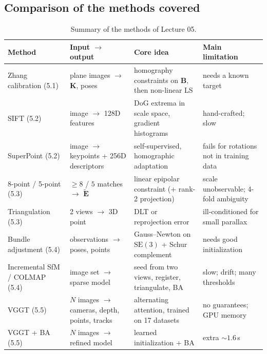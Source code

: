 \documentclass[11pt,a4paper]{article}
\newcommand{\SE}{\mathrm{SE}(3)}
\newcommand{\E}{\tilde{\bm E}}
\begin{document}
\subsection*{Comparison of the methods covered}
\begin{table}[H]
\centering
\small
\begin{tabular}{@{}p{2.9cm}p{3.5cm}p{4.0cm}p{3.1cm}@{}}
\toprule
Method & Input $\to$ output & Core idea & Main limitation\\
\midrule
Zhang calibration (5.1) & plane images $\to$ $\bm K$, poses & homography constraints on $\bm B$, then non-linear LS & needs a known target\\
SIFT (5.2) & image $\to$ 128D features & DoG extrema in scale space, gradient histograms & hand-crafted; slow\\
SuperPoint (5.2) & image $\to$ keypoints + 256D descriptors & self-supervised, homographic adaptation & fails for rotations not in training data\\
8-point / 5-point (5.3) & $\ge8$ / $5$ matches $\to$ $\E$ & linear epipolar constraint (+ rank-2 projection) & scale unobservable; 4-fold ambiguity\\
Triangulation (5.3) & 2 views $\to$ 3D point & DLT or reprojection error & ill-conditioned for small parallax\\
Bundle adjustment (5.4) & observations $\to$ poses, points & Gauss--Newton on $\SE$ + Schur complement & needs good initialization\\
Incremental SfM / COLMAP (5.4) & image set $\to$ sparse model & seed from two views, register, triangulate, BA & slow; drift; many thresholds\\
VGGT (5.5) & $N$ images $\to$ cameras, depth, points, tracks & alternating attention, trained on 17 datasets & no guarantees; GPU memory\\
VGGT + BA (5.5) & $N$ images $\to$ refined model & learned initialization + BA & extra $\sim1.6$\,s\\
\bottomrule
\end{tabular}
\caption{Summary of the methods of Lecture 05.}
\end{table}
\end{document}
